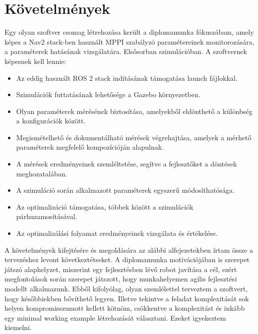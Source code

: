 \section{Követelmények}
Egy olyan szoftver csomag létrehozása került a diplomamunka fókuszábam, amely képes a Nav2 stack-ben használt MPPI szabályzó paramétereinek monitorozására, a paraméterek hatásának vizsgálatára. Elsősorban szimulációban. A szoftvernek képesnek kell lennie:
\begin{itemize}
    \item Az eddig használt ROS 2 stack indításának támogatása launch fájlokkal.
    \item Szimulációk futtatásának lehetősége a Gazebo környezetben.
    \item Olyan paraméterek mérésének biztosítása, amelyekből eldönthető a különbség a konfigurációk között.
    \item Megismételhető és dokumentálható mérések végrehajtása, amelyek a mérhető paraméterek megfelelő kompozícióján alapulnak.
    \item A mérések eredményeinek szemléltetése, segítve a fejlesztőket a döntések meghozatalában.
    \item A szimuláció során alkalmazott paraméterek egyszerű módosíthatósága.
    \item Az optimalizáció támogatása, többek között a szimulációk párhuzamosításával.
    \item Az optimalizálási folyamat eredményeinek vizsgálata és értékelése.
\end{itemize}

A követelmények kifejtésére és megoldására az alábbi alfejezetekben írtam össze a tervezéshez levont következtétseket. A diplomamunka motivációjában is szerepet játszó alaphelyzet, miszerint egy fejlesztésben lévő robot javítása a cél, ezért megfontolások során szerepet játszott, hogy munkahelyemen agilis fejlesztési modellt alkalmazunk. Ebből kifolyólag, olyan szemlélettel terveztem a szoftvert, hogy későbbiekben bővíthető legyen. Illetve tekintve a feladat komplexitását sok helyen kompromisszumott kellett kötnöm, csökkentve a komplexitást és inkább egy minimal working example létrehozását választani. Ezeket igyekeztem kiemelni.

